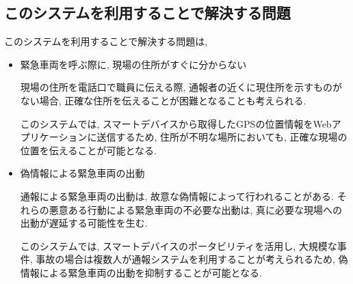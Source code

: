 \subsection{このシステムを利用することで解決する問題}
このシステムを利用することで解決する問題は,
\begin{itemize}
\item 緊急車両を呼ぶ際に, 現場の住所がすぐに分からない

現場の住所を電話口で職員に伝える際, 通報者の近くに現住所を示すものがない場合, 正確な住所を伝えることが困難となることも考えられる.

このシステムでは, スマートデバイスから取得したGPSの位置情報をWebアプリケーションに送信するため, 住所が不明な場所においても, 正確な現場の位置を伝えることが可能となる.

\item 偽情報による緊急車両の出動

通報による緊急車両の出動は, 故意な偽情報によって行われることがある.
それらの悪意ある行動による緊急車両の不必要な出動は, 真に必要な現場への出動が遅延する可能性を生む.

このシステムでは, スマートデバイスのポータビリティを活用し, 大規模な事件, 事故の場合は複数人が通報システムを利用することが考えられるため, 偽情報による緊急車両の出動を抑制することが可能となる.
\end{itemize}

\section{}
\subsection{}
